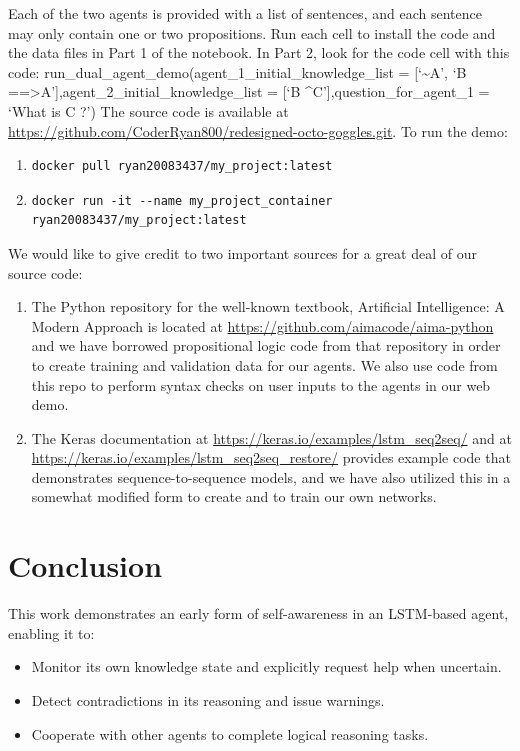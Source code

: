 \documentclass{article}
\begin{document}
Each of the two agents is provided with a list of sentences, and each sentence may only contain one or two propositions. Run each cell to install the code and the data files in Part 1 of the notebook. In Part 2, look for the code cell with this code:
run\_dual\_agent\_demo(agent\_1\_initial\_knowledge\_list = [‘\textasciitilde A’, ‘B ==\textgreater A’],agent\_2\_initial\_knowledge\_list = [‘B \textasciicircum C’],question\_for\_agent\_1 = ‘What is C ?’)
The source code is available at \url{https://github.com/CoderRyan800/redesigned-octo-goggles.git}.  To run the demo:

\begin{enumerate}
	\item \begin{verbatim}docker pull ryan20083437/my_project:latest\end{verbatim}
	\item \begin{verbatim}docker run -it --name my_project_container ryan20083437/my_project:latest\end{verbatim}
\end{enumerate}

We would like to give credit to two important sources for a great deal of our source code:
\begin{enumerate}
	\item The Python repository for the well-known textbook, Artificial Intelligence: A Modern Approach \cite{aima_3rd_ed} is located at \url{https://github.com/aimacode/aima-python} \cite{aima_repo} and we have borrowed propositional logic code from that repository in order to create training and validation data for our agents. We also use code from this repo to perform syntax checks on user inputs to the agents in our web demo.
	\item The Keras \cite{chollet2015keras} documentation at \url{https://keras.io/examples/lstm_seq2seq/} and at \url{https://keras.io/examples/lstm_seq2seq_restore/} provides example code that demonstrates sequence-to-sequence models, and we have also utilized this in a somewhat modified form to create and to train our own networks.
\end{enumerate}

\section{Conclusion}

This work demonstrates an early form of self-awareness in an LSTM-based agent, enabling it to:
\begin{itemize}
    \item Monitor its own knowledge state and explicitly request help when uncertain.
    \item Detect contradictions in its reasoning and issue warnings.
    \item Cooperate with other agents to complete logical reasoning tasks.
\end{itemize}
\end{document}
